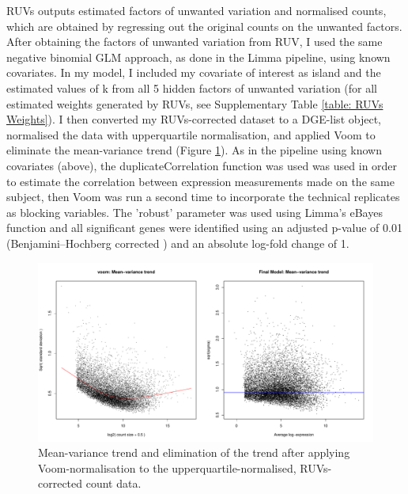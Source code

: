 \documentclass[12pt,a4paper,titlepage,twoside,openright]{book}
\begin{document}
\begin{mainmatter}
{RUVs outputs estimated factors of unwanted variation and normalised counts, which are obtained by regressing out the original counts on the unwanted factors. After obtaining the factors of unwanted variation from RUV, I used the same negative binomial GLM approach, as done in the Limma pipeline, using known covariates. In my model, I included my covariate of interest as island and the estimated values of k from all 5 hidden factors of unwanted variation (for all estimated weights generated by RUVs, see Supplementary Table \ref{table: RUVs Weights}). I then converted my RUVs-corrected dataset to a DGE-list object, normalised the data with upperquartile normalisation, and applied Voom to eliminate the mean-variance trend (﻿Figure \ref{fig:Voom normalisation RUV}). As in the pipeline using known covariates (above), the duplicateCorrelation function was used was used in order to estimate the correlation between expression measurements made on the same subject, then Voom was run a second time to incorporate the technical replicates as blocking variables. The 'robust' parameter was used using Limma's eBayes function and all significant genes were identified using an adjusted p-value of 0.01 (Benjamini–Hochberg corrected \cite{benjamini1995controlling}) and an absolute log-fold change of 1. 

\begin{figure}[htb!]
\centering
\includegraphics[width=\textwidth,height=\textheight,keepaspectratio]{Figures/Limma_voom_upperquartilenormalisation.pdf}
\caption{Mean-variance trend and elimination of the trend after applying Voom-normalisation to the upperquartile-normalised, RUVs-corrected count data.}
\label{fig:Voom normalisation RUV}
\end{figure}


}
\end{mainmatter}
\end{document}
